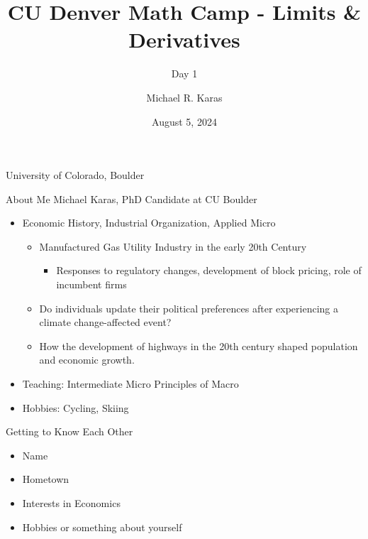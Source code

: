\documentclass[aspectratio=169]{beamer}
\title{CU Denver Math Camp - Limits \& Derivatives}
\subtitle{Day 1}
\date{August 5, 2024}
\author{Michael R. Karas}
\begin{document}
\begin{frame}
\maketitle

{\footnotesize University of Colorado, Boulder}
\end{frame}

\begin{frame}{About Me}\label{main1}
Michael Karas, PhD Candidate at CU Boulder
\begin{itemize}
	\begin{itemize}
		\item michael.karas@colorado.edu
		\item Entering my 4th year
	\end{itemize}
	\item Economic History, Industrial Organization, Applied Micro
	\begin{itemize}
		\item Manufactured Gas Utility Industry in the early 20th Century
			\begin{itemize}
				\item Responses to regulatory changes, development of block pricing, role of incumbent firms
			\end{itemize}
		\item Do individuals update their political preferences after experiencing a climate change-affected event?
		\item How the development of highways in the 20th century shaped population and economic growth.
	\end{itemize}
	\item Teaching: Intermediate Micro Principles of Macro
	\item Hobbies: Cycling, Skiing
\end{itemize}

\end{frame}


\begin{frame}{Getting to Know Each Other}\label{main1}
\begin{itemize}
	\item{Name}
	\item{Hometown}
	\item{Interests in Economics}
	\item{Hobbies or something about yourself}
\end{itemize}

\end{frame}
\end{document}
